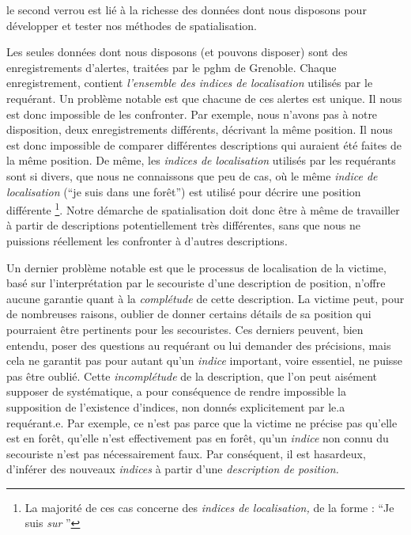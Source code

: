 le second verrou est lié à la richesse des données dont nous disposons
pour développer et tester nos méthodes de spatialisation.

Les seules données dont nous disposons (et pouvons disposer) sont des
enregistrements d'alertes, traitées par le \ac{pghm} de
Grenoble. Chaque enregistrement, contient \emph{l'ensemble des indices
  de localisation} utilisés par le requérant. Un problème notable est
que chacune de ces alertes est unique. Il nous est donc impossible de
les confronter.
Par exemple, nous n'avons pas à notre disposition, deux
enregistrements différents, décrivant la même position. Il nous est
donc impossible de comparer différentes descriptions qui auraient été
faites de la même position. De même, les \emph{indices de
  localisation} utilisés par les requérants sont si divers, que nous
ne connaissons que peu de cas, où le même \emph{indice de
  localisation} (\eg \enquote{je suis dans une forêt}) est utilisé
pour décrire une position différente \footnote{La majorité de ces cas
  concerne des \emph{indices de localisation,} de la forme :
  \enquote{Je suis \emph{sur} }}. Notre démarche de spatialisation doit
donc être à même de travailler à partir de descriptions
potentiellement très différentes, sans que nous ne puissions
réellement les confronter à d'autres descriptions.

Un dernier problème notable est que le processus de localisation de la
victime, basé sur l'interprétation par le secouriste d'une description
de position, n'offre aucune garantie quant à la \emph{complétude} de
cette description. La victime peut, pour de nombreuses raisons,
oublier de donner certains détails de sa position qui pourraient être
pertinents pour les secouristes. Ces derniers peuvent, bien entendu,
poser des questions au requérant ou lui demander des précisions, mais
cela ne garantit pas pour autant qu'un \emph{indice} important, voire
essentiel, ne puisse pas être oublié. Cette \emph{incomplétude} de la
description, que l'on peut aisément supposer de systématique, a pour
conséquence de rendre impossible la supposition de l’existence
d'indices, non donnés explicitement par le.a requérant.e. Par exemple,
ce n'est pas parce que la victime ne précise pas qu'elle est en forêt,
qu'elle n'est effectivement pas en forêt, \ie qu'un \emph{indice} non
connu du secouriste n'est pas nécessairement faux. Par conséquent, il
est hasardeux, d'inférer des nouveaux \emph{indices} à partir d'une
\emph{description de position.}

